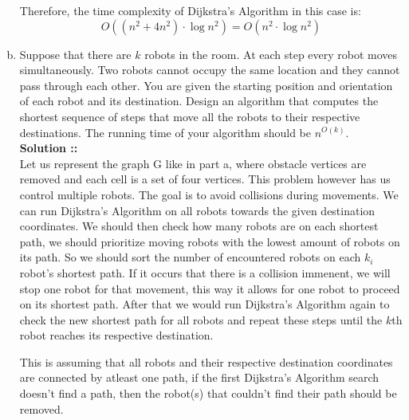 \documentclass[11pt]{article}
\begin{document}
\begin{enumerate}[(a)]
Therefore, the time complexity of Dijkstra's Algorithm in this case is:
$$O((n^2 + 4n^2)\cdot\log n^2) = O(n^2\cdot\log n^2)$$

\pagebreak

\item
Suppose that there are $k$ robots in the room. At each step every robot moves 
simultaneously. Two robots cannot occupy the same location and they cannot pass through each other. You are given the starting position and orientation of each robot and its 
destination. Design an algorithm that computes the shortest sequence of steps that move 
all the robots to their respective destinations. The running time of your algorithm should be $n^{O(k)}$. \\
\vspace{5px}\textbf{Solution ::} \\
Let us represent the graph G like in part a, where obstacle vertices are removed and each 
cell is a set of four vertices. This problem however has us control multiple robots. The 
goal is to avoid collisions
during movements. We can run Dijkstra's Algorithm on all robots towards the 
given destination coordinates. We should then check how many robots are on each shortest
path, we should prioritize moving robots with the lowest amount of robots on its path. 
So we should sort the number of encountered robots on each $k_i$ robot's shortest path. 
If it occurs that there is a collision immenent, we will stop one robot for that 
movement, this way it allows for one robot to proceed on its shortest path. After that we 
would run Dijkstra's Algorithm again to check the new shortest path for all robots and 
repeat these steps until the $k$th robot reaches its respective destination.

This is assuming that all robots and their respective destination coordinates are 
connected by atleast one path, if the first Dijkstra's Algorithm search doesn't find
a path, then the robot(s) that couldn't find their path should be removed.

\pagebreak


\end{enumerate}
\end{document}
